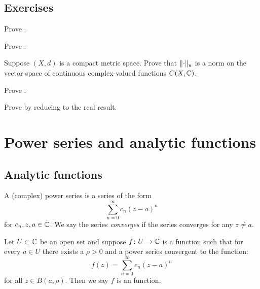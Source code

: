 \subsection{Exercises}

\begin{exercise}
Prove .
\end{exercise}

\begin{exercise}
Prove .
\end{exercise}

\begin{exercise}
Suppose $(X,d)$ is a compact metric space.
Prove that $\lVert {\cdot} \rVert_u$ is a norm on the vector space of
continuous complex-valued functions $C(X,{\mathbb{C}})$.
\end{exercise}

\begin{exercise}
Prove .
\end{exercise}

\begin{exercise}
Prove  by reducing to the real
result.
\end{exercise}


\sectionnewpage
\section{Power series and analytic functions}
\label{sec:analfuncs}


\subsection{Analytic functions}

A (complex) power series is a series of the form
\begin{equation*}
\sum_{n=0}^\infty c_n {(z-a)}^n
\end{equation*}
for $c_n, z, a \in {\mathbb{C}}$.  We say the series
\emph{converges} if the series converges for
any $z \not= a$.

Let $U \subset {\mathbb{C}}$ be an open set and
suppose $f \colon U \to {\mathbb{C}}$ is a function such that
for every $a \in U$ there exists a $\rho > 0$ and a power
series convergent to the function:
\begin{equation*}
f(z) = \sum_{n=0}^\infty c_n {(z-a)}^n
\end{equation*}
for all $z \in B(a,\rho)$.
Then we say $f$ is an \emph{} function.

